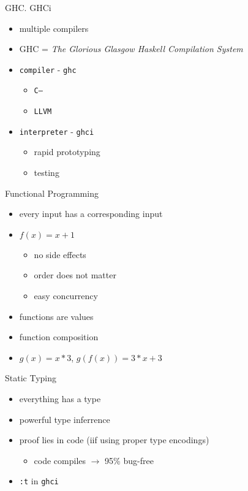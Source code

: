 \documentclass{beamer}
\begin{document}
\begin{frame}{GHC. GHCi}
  \begin{itemize}[<+->]
    \item multiple compilers
    \item GHC = \textit{The Glorious Glasgow Haskell Compilation System}
    \item \texttt{compiler} - \texttt{ghc}
    \begin{itemize}
      \item \texttt{C--}
      \item \texttt{LLVM}
    \end{itemize}
    \item \texttt{interpreter} - \texttt{ghci}
    \begin{itemize}
      \item rapid prototyping
      \item testing
    \end{itemize}
  \end{itemize}
\end{frame}

\begin{frame}{Functional Programming}
  \begin{itemize}[<+->]
    \item every input has a corresponding input
    \item $ f(x) = x + 1$
    \begin{itemize}
      \item no side effects
      \item order does not matter
      \item easy concurrency
    \end{itemize}
    \item functions are values
    \item function composition
    \item $g(x) = x * 3$, $g(f(x)) = 3 * x + 3$
  \end{itemize}
  \pause
  
\end{frame}

\begin{frame}{Static Typing}
  \begin{itemize}
    \item everything has a type
    \item powerful type inferrence
    \item proof lies in code (iif using proper type encodings)
    \begin{itemize}
      \item code compiles $\rightarrow$ 95\% bug-free
    \end{itemize}
    \item \texttt{:t} in \texttt{ghci}
  \end{itemize}
\end{frame}
\end{document}
